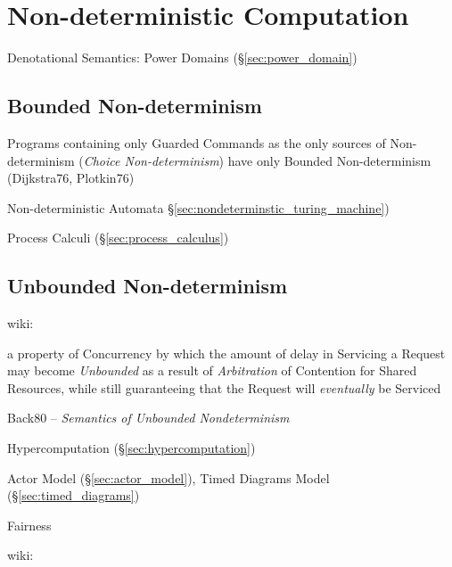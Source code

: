 \section{Non-deterministic Computation}
\label{sec:nondeterministic_computation}

Denotational Semantics: Power Domains (\S\ref{sec:power_domain})



\subsection{Bounded Non-determinism}\label{sec:bounded_nondeterminism}

Programs containing only Guarded Commands as the only sources of
Non-determinism (\emph{Choice Non-determinism}) have only Bounded
Non-determinism (Dijkstra76, Plotkin76)

\fist Non-deterministic Automata
\S\ref{sec:nondeterminstic_turing_machine})

\fist Process Calculi (\S\ref{sec:process_calculus})



\subsection{Unbounded Non-determinism}
\label{sec:unbounded_nondeterminism}

wiki:

a property of Concurrency by which the amount of delay in Servicing a
Request may become \emph{Unbounded} as a result of \emph{Arbitration}
of Contention for Shared Resources, while still guaranteeing that the
Request will \emph{eventually} be Serviced

Back80 -- \emph{Semantics of Unbounded Nondeterminism}

\fist Hypercomputation (\S\ref{sec:hypercomputation})

\fist Actor Model (\S\ref{sec:actor_model}), Timed Diagrams Model
(\S\ref{sec:timed_diagrams})

Fairness

wiki:

